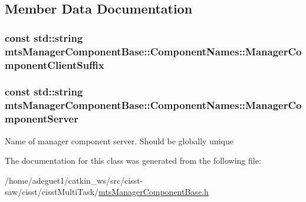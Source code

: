 \subsection{Member Data Documentation}
\hypertarget{classmts_manager_component_base_1_1_component_names_a7d237d677cbf6bf322307d4cae5f5a4d}{
\subsubsection[{Manager\-Component\-Client\-Suffix}]{\setlength{\rightskip}{0pt plus 5cm}const std\-::string mts\-Manager\-Component\-Base\-::\-Component\-Names\-::\-Manager\-Component\-Client\-Suffix\hspace{0.3cm}{\ttfamily [static]}}}\label{classmts_manager_component_base_1_1_component_names_a7d237d677cbf6bf322307d4cae5f5a4d}
\hypertarget{classmts_manager_component_base_1_1_component_names_ac0d5e1fbe029076826e635b1d309cb41}{
\subsubsection[{Manager\-Component\-Server}]{\setlength{\rightskip}{0pt plus 5cm}const std\-::string mts\-Manager\-Component\-Base\-::\-Component\-Names\-::\-Manager\-Component\-Server\hspace{0.3cm}{\ttfamily [static]}}}\label{classmts_manager_component_base_1_1_component_names_ac0d5e1fbe029076826e635b1d309cb41}
Name of manager component server. Should be globally unique 

The documentation for this class was generated from the following file\-:\begin{DoxyCompactItemize}
\item 
/home/adeguet1/catkin\-\_\-ws/src/cisst-\/saw/cisst/cisst\-Multi\-Task/\hyperlink{mts_manager_component_base_8h}{mts\-Manager\-Component\-Base.\-h}\end{DoxyCompactItemize}
